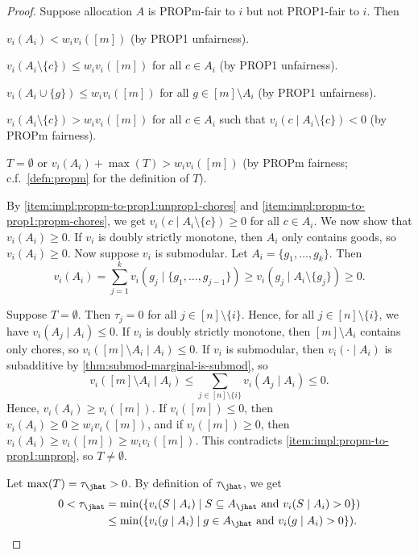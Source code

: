 \begin{proof}
Suppose allocation $A$ is PROPm-fair to $i$ but not PROP1-fair to $i$. Then
\begin{tightenum}
\item\label{item:impl:propm-to-prop1:unprop}$v_i(A_i) < w_iv_i([m])$ (by PROP1 unfairness).
\item\label{item:impl:propm-to-prop1:unprop1-chores}$v_i(A_i \setminus \{c\}) \le w_iv_i([m])$
    for all $c \in A_i$ (by PROP1 unfairness).
\item\label{item:impl:propm-to-prop1:unprop1-goods}$v_i(A_i \cup \{g\}) \le w_iv_i([m])$
    for all $g \in [m] \setminus A_i$ (by PROP1 unfairness).
\item\label{item:impl:propm-to-prop1:propm-chores}$v_i(A_i \setminus \{c\}) > w_iv_i([m])$
    for all $c \in A_i$ such that $v_i(c \mid A_i \setminus \{c\}) < 0$ (by PROPm fairness).
\item\label{item:impl:propm-to-prop1:propm-goods}$T = \emptyset$ or $v_i(A_i) + \max(T) > w_iv_i([m])$
    (by PROPm fairness; c.f.~\cref{defn:propm} for the definition of $T$).
\end{tightenum}

By \ref{item:impl:propm-to-prop1:unprop1-chores} and \ref{item:impl:propm-to-prop1:propm-chores},
we get $v_i(c \mid A_i \setminus \{c\}) \ge 0$ for all $c \in A_i$.
We now show that $v_i(A_i) \ge 0$.
If $v_i$ is doubly strictly monotone, then $A_i$ only contains goods, so $v_i(A_i) \ge 0$.
Now suppose $v_i$ is submodular. Let $A_i = \{g_1, \ldots, g_k\}$. Then
\[ v_i(A_i) = \sum_{j=1}^k v_i(g_j \mid \{g_1, \ldots, g_{j-1}\})
    \ge v_i(g_j \mid A_i \setminus \{g_j\}) \ge 0. \]

Suppose $T = \emptyset$. Then $\tau_j = 0$ for all $j \in [n] \setminus \{i\}$.
Hence, for all $j \in [n] \setminus \{i\}$, we have $v_i(A_j \mid A_i) \le 0$.
If $v_i$ is doubly strictly monotone, then $[m] \setminus A_i$ contains only chores,
so $v_i([m] \setminus A_i \mid A_i) \le 0$. If $v_i$ is submodular, then
$v_i(\cdot \mid A_i)$ is subadditive by \cref{thm:submod-marginal-is-submod}, so
\[ v_i([m] \setminus A_i \mid A_i)
    \le \sum_{j \in [n] \setminus \{i\}} v_i(A_j \mid A_i) \le 0. \]
Hence, $v_i(A_i) \ge v_i([m])$.
If $v_i([m]) \le 0$, then $v_i(A_i) \ge 0 \ge w_iv_i([m])$,
and if $v_i([m]) \ge 0$, then $v_i(A_i) \ge v_i([m]) \ge w_iv_i([m])$.
This contradicts \ref{item:impl:propm-to-prop1:unprop}, so $T \neq \emptyset$.

Let $\max(T) = \tau_{\jhat} > 0$. By definition of $\tau_{\jhat}$, we get
\begin{align*}
0 < \tau_{\jhat} &= \min(\{v_i(S \mid A_i) \mid S \subseteq A_{\jhat} \textrm{ and } v_i(S \mid A_i) > 0\})
\\ &\le \min(\{v_i(g \mid A_i) \mid g \in A_{\jhat} \textrm{ and } v_i(g \mid A_i) > 0\}).
\end{align*}


\end{proof}
